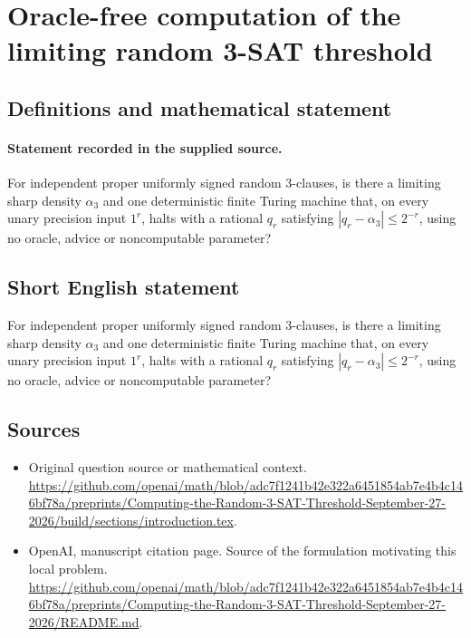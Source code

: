 \documentclass[11pt]{article}
\begin{document}
\section*{Oracle-free computation of the limiting random 3-SAT threshold}\label{statement}
\subsection{Definitions and mathematical statement}
\paragraph{Statement recorded in the supplied source.}
For independent proper uniformly signed random 3-clauses, is there a limiting sharp density $\alpha _3$ and one deterministic finite Turing machine that, on every unary precision input $1^r$, halts with a rational $q_r$ satisfying $|q_r-\alpha _3|\leq 2^{-r}$, using no oracle, advice or noncomputable parameter?
\subsection{Short English statement}
For independent proper uniformly signed random 3-clauses, is there a limiting sharp density $\alpha _3$ and one deterministic finite Turing machine that, on every unary precision input $1^r$, halts with a rational $q_r$ satisfying $|q_r-\alpha _3|\leq 2^{-r}$, using no oracle, advice or noncomputable parameter?
\subsection{Sources}
\begin{itemize}
\item[S1] Original question source or mathematical context.
\url{https://github.com/openai/math/blob/adc7f1241b42e322a6451854ab7e4b4c146bf78a/preprints/Computing-the-Random-3-SAT-Threshold-September-27-2026/build/sections/introduction.tex}.
\item[S2] OpenAI, manuscript citation page. Source of the formulation motivating this local problem.
\url{https://github.com/openai/math/blob/adc7f1241b42e322a6451854ab7e4b4c146bf78a/preprints/Computing-the-Random-3-SAT-Threshold-September-27-2026/README.md}.
\end{itemize}
\end{document}
